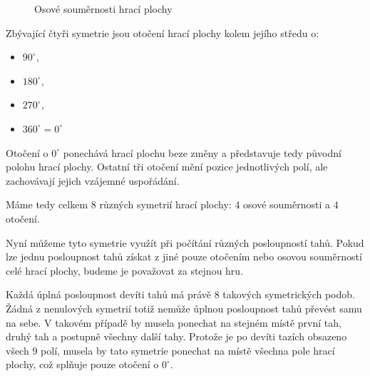 \documentclass[12pt,a4paper]{article}
\begin{document}
\begin{figure}[h]
    \begin{center}
    \end{center}

    \caption{Osové souměrnosti hrací plochy}
    \label{fig:TicTacToeOsovaSymetrieHry}
\end{figure}

Zbývající čtyři symetrie jsou otočení hrací plochy kolem jejího středu o:
\begin{itemize}
    \item $90^\circ$,
    \item $180^\circ$,
    \item $270^\circ$,
    \item $360^\circ = 0^\circ$
\end{itemize}

Otočení o $0^\circ$ ponechává hrací plochu beze změny a představuje tedy
původní polohu hrací plochy. Ostatní tři otočení mění pozice jednotlivých polí,
ale zachovávají jejich vzájemné uspořádání.

Máme tedy celkem $8$ různých symetrií hrací plochy:
$4$ osové souměrnosti a $4$ otočení.

Nyní můžeme tyto symetrie využít při počítání různých posloupností tahů.
Pokud lze jednu posloupnost tahů získat z jiné pouze otočením nebo osovou
souměrností celé hrací plochy, budeme je považovat za stejnou hru.

Každá úplná posloupnost devíti tahů má právě $8$ takových symetrických podob.
Žádná z nenulových symetrií totiž nemůže úplnou posloupnost tahů převést samu
na sebe. V takovém případě by musela ponechat na stejném místě první tah,
druhý tah a postupně všechny další tahy. Protože je po devíti tazích obsazeno
všech $9$ polí, musela by tato symetrie ponechat na místě všechna pole hrací
plochy, což splňuje pouze otočení o $0^\circ$.
\end{document}
